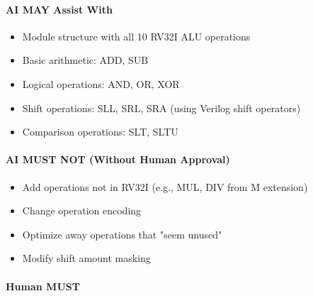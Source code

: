 \paragraph{\texorpdfstring{\ok{} AI MAY Assist
With}{ AI MAY Assist With}}\label{cr:status:phase1-ai-human-responsibilities:white-check-mark-ai-may-assist-with-2}

\begin{record}

\begin{itemize}
\tightlist
\item
  Module structure with all 10 RV32I ALU operations
\item
  Basic arithmetic: ADD, SUB
\item
  Logical operations: AND, OR, XOR
\item
  Shift operations: SLL, SRL, SRA (using Verilog shift operators)
\item
  Comparison operations: SLT, SLTU
\end{itemize}

\end{record}

\paragraph{\texorpdfstring{\warn{} AI MUST NOT (Without Human
Approval)}{ AI MUST NOT (Without Human Approval)}}\label{cr:status:phase1-ai-human-responsibilities:warning-ai-must-not-without-human-approval-2}

\begin{record}

\begin{itemize}
\tightlist
\item
  Add operations not in RV32I (e.g., MUL, DIV from M extension)
\item
  Change operation encoding
\item
  Optimize away operations that "seem unused"
\item
  Modify shift amount masking
\end{itemize}

\end{record}

\paragraph{\texorpdfstring{\hold{} Human MUST}{ Human MUST}}\label{cr:status:phase1-ai-human-responsibilities:raised-hand-human-must-2}


